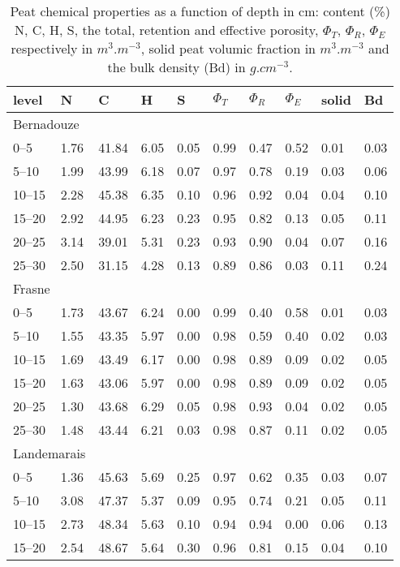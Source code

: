 \begin{table}
\centering
\caption{Peat chemical properties as a function of depth in cm: content (\%) N, C, H, S, the total, retention and effective porosity, $\Phi_{T}$, $\Phi_{R}$, $\Phi_{E}$ respectively in $m^{3}.m^{-3}$, solid peat volumic fraction in $m^{3}.m^{-3}$ and the bulk density (Bd) in $g.cm^{-3}$.} 
\begin{tabular}{llllllllll}
\toprule
level  & N & C & H & S & $\Phi_{T}$ & $\Phi_{R}$ & $\Phi_{E}$ & solid & Bd \\
\midrule
\multicolumn{2}{l}{Bernadouze} & & & & & & & & \\[-.5ex] 
0--5 & 1.76 & 41.84 & 6.05 & 0.05   & 0.99 & 0.47 & 0.52 & 0.01 & 0.03 \\
5--10 & 1.99 & 43.99 & 6.18 & 0.07 & 0.97 & 0.78 & 0.19 & 0.03 & 0.06 \\
10--15 & 2.28 & 45.38 & 6.35 & 0.10 & 0.96 & 0.92 & 0.04 & 0.04 & 0.10 \\ 
15--20 & 2.92 & 44.95 & 6.23 & 0.23 & 0.95 & 0.82 & 0.13 & 0.05 & 0.11 \\ 
20--25 & 3.14 & 39.01 & 5.31 & 0.23 & 0.93 & 0.90 & 0.04 & 0.07 & 0.16 \\
25--30 & 2.50 & 31.15 & 4.28 & 0.13 & 0.89 & 0.86 & 0.03 & 0.11 & 0.24 \\
\multicolumn{2}{l}{Frasne} & & & &  & & & & \\[-.5ex] 
0--5 & 1.73 & 43.67 & 6.24 & 0.00 & 0.99 & 0.40 & 0.58 & 0.01 & 0.03 \\ 
5--10 & 1.55 & 43.35 & 5.97 & 0.00 & 0.98 & 0.59 & 0.40 & 0.02 & 0.03 \\
10--15 & 1.69 & 43.49 & 6.17 & 0.00 & 0.98 & 0.89 & 0.09 & 0.02 & 0.05 \\
15--20 & 1.63 & 43.06 & 5.97 & 0.00 & 0.98 & 0.89 & 0.09 & 0.02 & 0.05 \\
20--25 & 1.30 & 43.68 & 6.29 & 0.05 & 0.98 & 0.93 & 0.04 & 0.02 & 0.05 \\ 
25--30 & 1.48 & 43.44 & 6.21 & 0.03 & 0.98 & 0.87 & 0.11 & 0.02 & 0.05 \\
\multicolumn{2}{l}{Landemarais} & & & & & & & & \\[-.5ex] 
0--5 & 1.36 & 45.63 & 5.69 & 0.25 & 0.97 & 0.62 & 0.35 & 0.03 & 0.07 \\
5--10 & 3.08 & 47.37 & 5.37 & 0.09 & 0.95 & 0.74 & 0.21 & 0.05 & 0.11 \\
10--15 & 2.73 & 48.34 & 5.63 & 0.10 & 0.94 & 0.94 & 0.00 & 0.06 & 0.13 \\
15--20 & 2.54 & 48.67 & 5.64 & 0.30 & 0.96 & 0.81 & 0.15 & 0.04 & 0.10 \\

\end{tabular}
\end{table}
